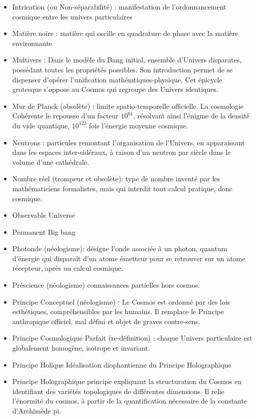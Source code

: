 \documentclass[a4paper,12pt]{article}
\begin{document}
\begin{appendix}
\begin{itemize}
\item Intrication (ou Non-séparabilité) : manifestation de l’ordonnancement cosmique entre les univers particulaires
\item Matière noire : matière qui oscille en quadrature de phase avec la matière environnante


\item Multivers : Dans le modèle du Bang initial, ensemble d'Univers disparates, possédant toutes les propriétés possibles. Son introduction permet de se dispenser d'opérer l'unification mathémtiques-physique. Cet épicycle grotesque s'oppose au Cosmos qui regroupe des Univers identiques. 


\item Mur de Planck (obsolète) : limite spatio-temporelle officielle. La cosmologie Cohérente le repousse d’un facteur $10^{61}$, résolvant ainsi l’énigme de la densité du vide quantique, $10^{122}$ fois l’énergie moyenne cosmique.
\item Neutrons : particules remontant l’organisation de l’Univers, en apparaissant dans les espaces inter-sidéraux, à raison d’un neutron par siècle dans le volume d’une cathédrale.
\item Nombre réel (trompeur et obsolète): type de nombre inventé par les mathématiciens formalistes, mais qui interdit tout calcul pratique, donc cosmique.
\item Observable Universe
\item Permanent Big bang
\item Photonde (néologisme): désigne l’onde associée à un photon, quantum d’énergie qui disparaît d’un atome émetteur pour se retrouver sur un atome récepteur, après un calcul cosmique.
\item Préscience (néologisme) connaissances partielles hors cosmos.
\item Principe Conceptuel (néologisme) : Le Cosmos est ordonné par des lois esthétiques, compréhensibles par les humains. Il remplace le Principe anthropique officiel, mal défini et objet de graves contre-sens.
\item Principe Cosmologique Parfait (re-définition) : chaque Univers particulaire est globalement homogène, isotrope et invariant.
\item Principe Holique Idéalisation diophantienne du Principe Holographique
\item Principe Holographique principe expliquant la structuration du Cosmos en identifiant des variétés topologiques de différentes dimensions. Il relie l’énormité du cosmos, à partir de la quantification nécessaire de la constante d’Archimède pi.

\end{itemize}
\end{appendix}
\end{document}
